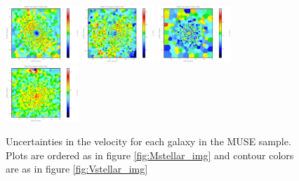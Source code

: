 \begin{figure}
      \centering
      \includegraphics[width=0.245\textwidth]{Mmaps/ic1459_stellar_vel_uncert.png}
      \includegraphics[width=0.245\textwidth]{Mmaps/ngc1316_stellar_vel_uncert.png}
      \includegraphics[width=0.245\textwidth]{Mmaps/ic4296_stellar_vel_uncert.png}
      \includegraphics[width=0.245\textwidth]{Mmaps/ngc1399_stellar_vel_uncert.png}
      \caption[MUSE velocity uncertocity maps]{Uncertainties in the velocity for each galaxy in the MUSE sample. Plots are ordered as in figure \ref{fig:Mstellar_img} and contour colors are as in figure \ref{fig:Vstellar_img}}
      \label{fig:Mstellar_vel_uncert}
\end{figure}

